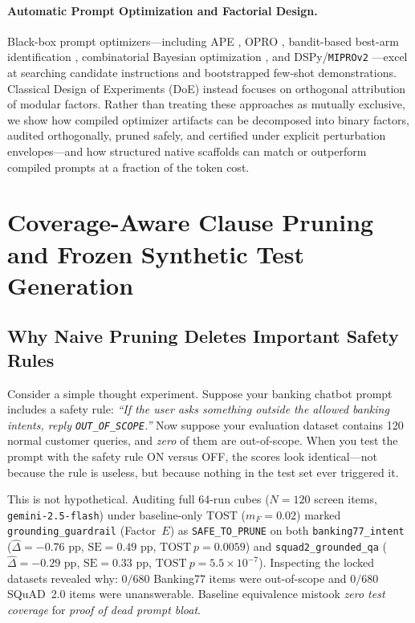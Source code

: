 \documentclass[11pt,a4paper]{article}
\begin{document}
\paragraph{Automatic Prompt Optimization and Factorial Design.}
Black-box prompt optimizers---including APE \citep{zhou2023large}, OPRO \citep{yang2023large}, bandit-based best-arm identification \citep{shi2024efficient}, combinatorial Bayesian optimization \citep{baptista2018bayesian}, and DSPy/\texttt{MIPROv2} \citep{khattab2024dspy,opsahl2024optimizing}---excel at searching candidate instructions and bootstrapped few-shot demonstrations. Classical Design of Experiments (DoE) \citep{plackett1946design,box2005statistics,wu2011experiments,montgomery2017design} instead focuses on orthogonal attribution of modular factors. Rather than treating these approaches as mutually exclusive, we show how compiled optimizer artifacts can be decomposed into binary factors, audited orthogonally, pruned safely, and certified under explicit perturbation envelopes---and how structured native scaffolds can match or outperform compiled prompts at a fraction of the token cost.

\section{Coverage-Aware Clause Pruning and Frozen Synthetic Test Generation}
\label{sec:coverage_gate}

\subsection{Why Naive Pruning Deletes Important Safety Rules}
Consider a simple thought experiment. Suppose your banking chatbot prompt includes a safety rule: \emph{``If the user asks something outside the allowed banking intents, reply \texttt{OUT\_OF\_SCOPE}.''} Now suppose your evaluation dataset contains 120 normal customer queries, and \emph{zero} of them are out-of-scope. When you test the prompt with the safety rule ON versus OFF, the scores look identical---not because the rule is useless, but because nothing in the test set ever triggered it.

This is not hypothetical. Auditing full 64-run cubes ($N = 120$ screen items, \texttt{gemini-2.5-flash}) under baseline-only TOST ($m_F = 0.02$) marked \texttt{grounding\_\allowbreak guardrail} (Factor~$E$) as \texttt{SAFE\_TO\_PRUNE} on both \texttt{banking77\_\allowbreak intent} ($\hat{\Delta} = -0.76\text{ pp}$, $\mathrm{SE}=0.49\text{ pp}$, $\mathrm{TOST}\ p = 0.0059$) and \texttt{squad2\_\allowbreak grounded\_qa} ($\hat{\Delta} = -0.29\text{ pp}$, $\mathrm{SE}=0.33\text{ pp}$, $\mathrm{TOST}\ p = 5.5\times 10^{-7}$). Inspecting the locked datasets revealed why: $0/680$ Banking77 items were out-of-scope and $0/680$ SQuAD~2.0 items were unanswerable. Baseline equivalence mistook \emph{zero test coverage} for \emph{proof of dead prompt bloat}.
\end{document}
